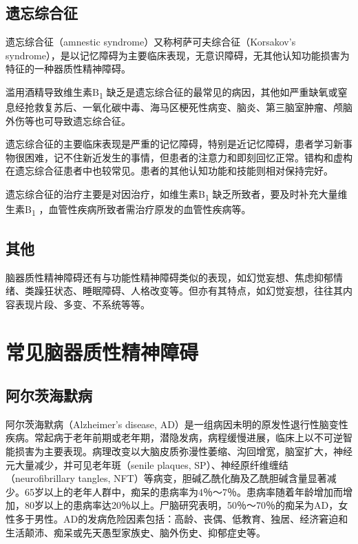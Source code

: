 \subsection{遗忘综合征}

遗忘综合征（amnestic syndrome）又称柯萨可夫综合征（Korsakov's
syndrome），是以记忆障碍为主要临床表现，无意识障碍，无其他认知功能损害为特征的一种器质性精神障碍。

滥用酒精导致维生素B\textsubscript{1}
缺乏是遗忘综合征的最常见的病因，其他如严重缺氧或窒息经抢救复苏后、一氧化碳中毒、海马区梗死性病变、脑炎、第三脑室肿瘤、颅脑外伤等也可导致遗忘综合征。

遗忘综合征的主要临床表现是严重的记忆障碍，特别是近记忆障碍，患者学习新事物很困难，记不住新近发生的事情，但患者的注意力和即刻回忆正常。错构和虚构在遗忘综合征患者中也较常见。患者的其他认知功能和技能则相对保持完好。

遗忘综合征的治疗主要是对因治疗，如维生素B\textsubscript{1}
缺乏所致者，要及时补充大量维生素B\textsubscript{1}
，血管性疾病所致者需治疗原发的血管性疾病等。

\subsection{其他}

脑器质性精神障碍还有与功能性精神障碍类似的表现，如幻觉妄想、焦虑抑郁情绪、类躁狂状态、睡眠障碍、人格改变等。但亦有其特点，如幻觉妄想，往往其内容表现片段、多变、不系统等等。


\section{常见脑器质性精神障碍}

\subsection{阿尔茨海默病}

阿尔茨海默病（Alzheimer's disease,
AD）是一组病因未明的原发性退行性脑变性疾病。常起病于老年前期或老年期，潜隐发病，病程缓慢进展，临床上以不可逆智能损害为主要表现。病理改变以大脑皮质弥漫性萎缩、沟回增宽，脑室扩大，神经元大量减少，并可见老年斑（senile
plaques, SP）、神经原纤维缠结（neurofibrillary tangles,
NFT）等病变，胆碱乙酰化酶及乙酰胆碱含量显著减少。65岁以上的老年人群中，痴呆的患病率为4％～7％。患病率随着年龄增加而增加，80岁以上的患病率达20％以上。尸脑研究表明，50％～70％的痴呆为AD，女性多于男性。AD的发病危险因素包括：高龄、丧偶、低教育、独居、经济窘迫和生活颠沛、痴呆或先天愚型家族史、脑外伤史、抑郁症史等。

